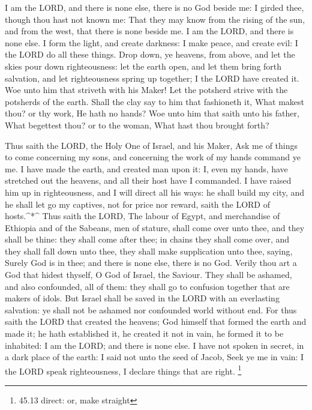  I am the LORD, and there is none else, there is no God
beside me: I girded thee, though thou hast not known me: 
That they may know from the rising of the sun, and from the west, that
there is none beside me. I am the LORD, and there is none else.
 I form the light, and create darkness: I make peace, and
create evil: I the LORD do all these things.  Drop down, ye
heavens, from above, and let the skies pour down righteousness: let the
earth open, and let them bring forth salvation, and let righteousness
spring up together; I the LORD have created it.  Woe unto
him that striveth with his Maker! Let the potsherd strive with the
potsherds of the earth. Shall the clay say to him that fashioneth it,
What makest thou? or thy work, He hath no hands?  Woe unto
him that saith unto his father, What begettest thou? or to the woman,
What hast thou brought forth?

 Thus saith the LORD, the Holy One of Israel, and his
Maker, Ask me of things to come concerning my sons, and concerning the
work of my hands command ye me.  I have made the earth, and
created man upon it: I, even my hands, have stretched out the heavens,
and all their host have I commanded.  I have raised him up
in righteousness, and I will direct all his ways: he shall build my
city, and he shall let go my captives, not for price nor reward, saith
the LORD of hosts.\^{}*\^{}  Thus saith the LORD, The
labour of Egypt, and merchandise of Ethiopia and of the Sabeans, men of
stature, shall come over unto thee, and they shall be thine: they shall
come after thee; in chains they shall come over, and they shall fall
down unto thee, they shall make supplication unto thee, saying, Surely
God is in thee; and there is none else, there is no God. 
Verily thou art a God that hidest thyself, O God of Israel, the Saviour.
 They shall be ashamed, and also confounded, all of them:
they shall go to confusion together that are makers of idols.
 But Israel shall be saved in the LORD with an everlasting
salvation: ye shall not be ashamed nor confounded world without end.
 For thus saith the LORD that created the heavens; God
himself that formed the earth and made it; he hath established it, he
created it not in vain, he formed it to be inhabited: I am the LORD; and
there is none else.  I have not spoken in secret, in a dark
place of the earth: I said not unto the seed of Jacob, Seek ye me in
vain: I the LORD speak righteousness, I declare things that are right.
\footnote{45.13 direct: or, make straight}

